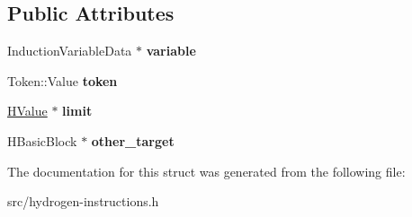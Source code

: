 \subsection*{Public Attributes}
\begin{DoxyCompactItemize}
\item 
\hypertarget{structv8_1_1internal_1_1_v8___f_i_n_a_l_1_1_limit_from_predecessor_block_ad74524b275b3a640e26467b1356ad107}{}Induction\+Variable\+Data $\ast$ {\bfseries variable}\label{structv8_1_1internal_1_1_v8___f_i_n_a_l_1_1_limit_from_predecessor_block_ad74524b275b3a640e26467b1356ad107}

\item 
\hypertarget{structv8_1_1internal_1_1_v8___f_i_n_a_l_1_1_limit_from_predecessor_block_af46c545f833e85277aca818cfdf04720}{}Token\+::\+Value {\bfseries token}\label{structv8_1_1internal_1_1_v8___f_i_n_a_l_1_1_limit_from_predecessor_block_af46c545f833e85277aca818cfdf04720}

\item 
\hypertarget{structv8_1_1internal_1_1_v8___f_i_n_a_l_1_1_limit_from_predecessor_block_a1fe0208d855b6a18417ebf865520ef13}{}\hyperlink{classv8_1_1internal_1_1_h_value}{H\+Value} $\ast$ {\bfseries limit}\label{structv8_1_1internal_1_1_v8___f_i_n_a_l_1_1_limit_from_predecessor_block_a1fe0208d855b6a18417ebf865520ef13}

\item 
\hypertarget{structv8_1_1internal_1_1_v8___f_i_n_a_l_1_1_limit_from_predecessor_block_a62ef4897751e903eee8176a992c2ae4f}{}H\+Basic\+Block $\ast$ {\bfseries other\+\_\+target}\label{structv8_1_1internal_1_1_v8___f_i_n_a_l_1_1_limit_from_predecessor_block_a62ef4897751e903eee8176a992c2ae4f}

\end{DoxyCompactItemize}


The documentation for this struct was generated from the following file\+:\begin{DoxyCompactItemize}
\item 
src/hydrogen-\/instructions.\+h\end{DoxyCompactItemize}
